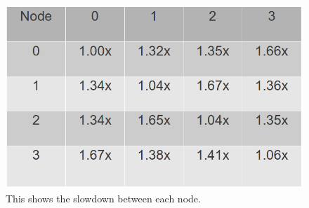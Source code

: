 \begin{figure}
    \centering
    \includegraphics[scale=0.35]{numaMatrix.png}
    \caption{This shows the slowdown between each node. }
    \label{fig:numaMatrix}
\end{figure}

